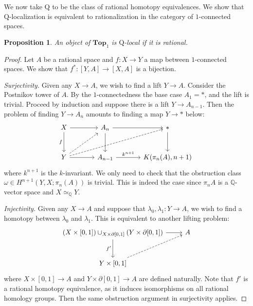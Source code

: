 \documentclass[psamsfonts]{amsart}
\newtheorem{prop}{Proposition}[section]
\theoremstyle{definition}
\newcommand{\Q}{\mathbb{Q}}
\newcommand{\Top}{\mathbf{Top}}
\numberwithin{equation}{section}
\begin{document}
We now take $\mathrm{Q}$ to be the class of rational homotopy equivalences. We show that $\mathrm{Q}$-localization is equivalent to rationalization in the category of $1$-connected spaces.

\begin{prop}
An object of $\Top_1$ is $\mathrm{Q}$-local if it is rational.
\end{prop}
\begin{proof}
Let $A$ be a rational space and $f:X\to Y$ a map between $1$-connected spaces. We show that $f^\ast:[Y,A]\to[X,A]$ is a bijection.\medbreak

\textit{Surjectivity.} Given any $X\to A$, we wish to find a lift $Y\to A$. Consider the Postnikov tower of $A$. By the $1$-connectedness the base case $A_1=\ast$, and the lift is trivial. Proceed by induction and suppose there is a lift $Y\to A_{n-1}$. Then the problem of finding $Y\to A_n$ amounts to finding a map $Y\to\ast$ below:
\[\begin{tikzcd}[column sep=large, row sep=large]
X\arrow[d,"f"']\arrow[r]&A_n\arrow[d]\arrow[r]&\ast\arrow[d]\\
Y\arrow[r]\arrow[urr,dashed]\arrow[ur,dashed]&A_{n-1}\arrow[r,"k^{n+1}"]&K(\pi_n(A),n+1)
\end{tikzcd}\]
where $k^{n+1}$ is the $k$-invariant. We only need to check that the obstruction class $\omega\in H^{n+1}(Y,X;\pi_n(A))$ is trivial. This is indeed the case since $\pi_nA$ is a $\Q$-vector space and $X\simeq_\Q Y$.\medbreak

\textit{Injectivity.} Given any $X\to A$ and suppose that $\lambda_0,\lambda_1:Y\to A$, we wish to find a homotopy between $\lambda_0$ and $\lambda_1$. This is equivalent to another lifting problem:
\[\begin{tikzcd}[row sep=large]
(X\times[0,1])\cup_{X\times\partial[0,1]}(Y\times\partial[0,1])\arrow[r]\arrow[d,"f'"']&A\\
Y\times[0,1]\arrow[ur,dashed]
\end{tikzcd}\]
where $X\times[0,1]\to A$ and $Y\times\partial[0,1]\to A$ are defined naturally. Note that $f'$ is a rational homotopy equivalence, as it induces isomorphisms on all rational homology groups. Then the same obstruction argument in surjectivity applies.
\end{proof}
\end{document}
